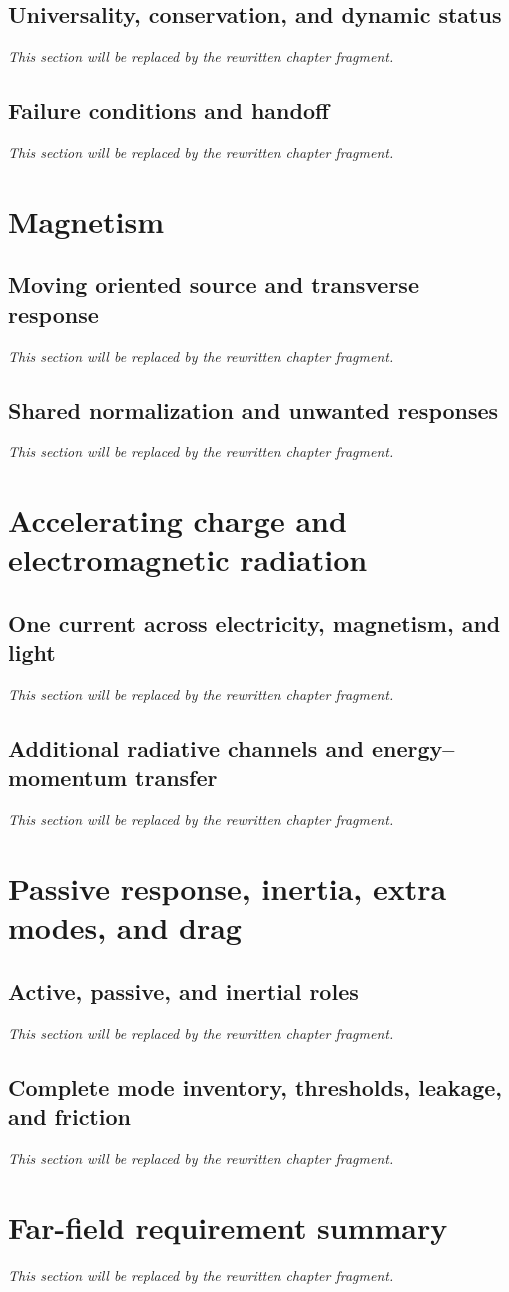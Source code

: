 \documentclass[11pt,oneside]{report}
\newcommand{\DraftPlaceholder}{%
  \textcolor{ProposalGray}{\emph{This section will be replaced by the rewritten chapter fragment.}}%
}
\begin{document}
{  \subsection{Universality, conservation, and dynamic status}
  \DraftPlaceholder
  \subsection{Failure conditions and handoff}
  \DraftPlaceholder

  \section{Magnetism}
  \subsection{Moving oriented source and transverse response}
  \DraftPlaceholder
  \subsection{Shared normalization and unwanted responses}
  \DraftPlaceholder

  \section{Accelerating charge and electromagnetic radiation}
  \subsection{One current across electricity, magnetism, and light}
  \DraftPlaceholder
  \subsection{Additional radiative channels and energy--momentum transfer}
  \DraftPlaceholder

  \section{Passive response, inertia, extra modes, and drag}
  \subsection{Active, passive, and inertial roles}
  \DraftPlaceholder
  \subsection{Complete mode inventory, thresholds, leakage, and friction}
  \DraftPlaceholder

  \section{Far-field requirement summary}
  \DraftPlaceholder
}
\end{document}
